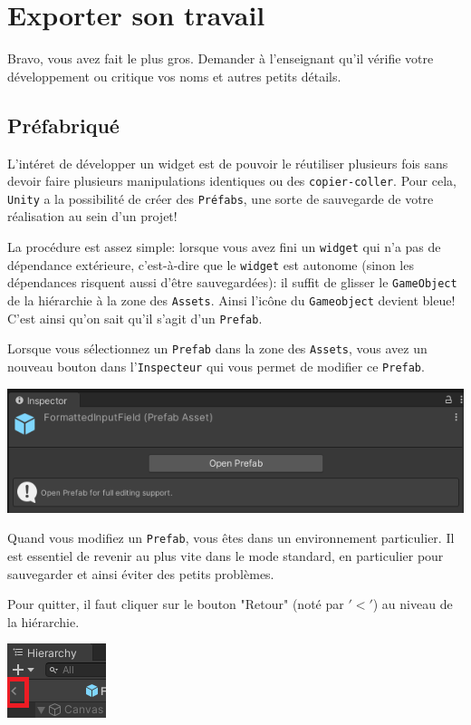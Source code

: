 \documentclass[a4paper,10pt]{article}
\newenvironment{info}%
{\begin{tcolorbox}[breakable,colback=green!5!white,colframe=green!75!black,title=Information]}%
{\end{tcolorbox}}
\newenvironment{attention}%
{\begin{tcolorbox}[breakable,colback=green!25!white,colframe=red!55!black,title=Attention]}%
{\end{tcolorbox}}
\begin{document}
\section{Exporter son travail}

Bravo, vous avez fait le plus gros. Demander à l'enseignant  qu'il vérifie votre développement ou critique vos noms et autres petits détails.

\subsection{Préfabriqué}
L'intéret de développer un widget est de pouvoir le réutiliser plusieurs fois sans devoir faire plusieurs manipulations identiques ou des \texttt{copier-coller}. Pour cela, \texttt{Unity} a la possibilité de créer des \texttt{Préfabs}, une sorte de sauvegarde de votre réalisation au sein d'un projet!

La procédure est assez simple: lorsque vous avez fini un \texttt{widget} qui n'a pas de dépendance extérieure, c'est-à-dire que le \texttt{widget} est autonome (sinon les dépendances risquent aussi d'être sauvegardées): il suffit de glisser le \texttt{GameObject} de la hiérarchie à la zone des \texttt{Assets}. Ainsi l'icône du \texttt{Gameobject} devient bleue! C'est ainsi qu'on sait qu'il s'agit d'un \texttt{Prefab}.


\begin{info}
Lorsque vous sélectionnez un \texttt{Prefab} dans la zone des \texttt{Assets}, vous avez un nouveau bouton dans l'\texttt{Inspecteur} qui vous permet de modifier ce \texttt{Prefab}.
\begin{center}
	\includegraphics[width=0.5\linewidth]{rc/unity_set_ui_open_prefab}
\end{center}
\end{info}

\begin{attention}
Quand vous modifiez un \texttt{Prefab}, vous êtes dans un environnement particulier. Il est essentiel de revenir au plus vite dans le mode standard, en particulier pour sauvegarder et ainsi éviter des petits problèmes. 

Pour quitter, il faut cliquer sur le bouton "Retour" (noté par $'<'$) au niveau de la hiérarchie.
\begin{center}
	\includegraphics[width=0.3\linewidth]{rc/unity_set_ui_close_prefab}
\end{center}
\end{attention}
\end{document}
